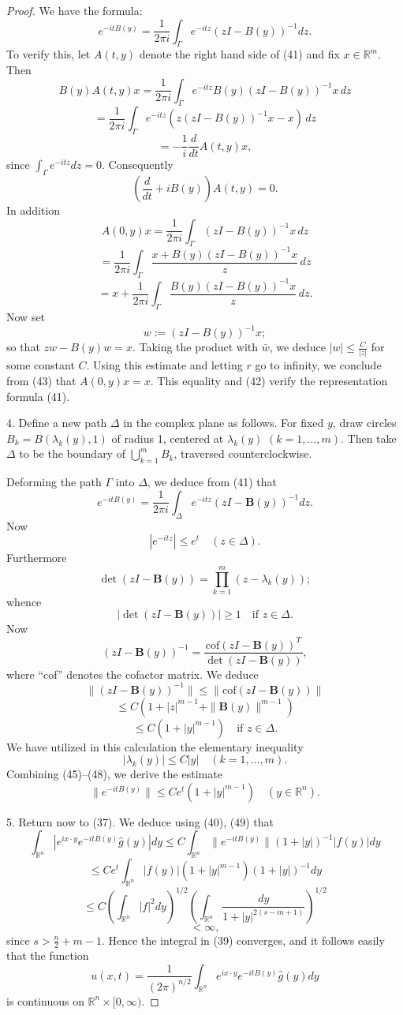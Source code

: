 \begin{proof}
We have the formula:
\[
e^{-itB(y)} = \frac{1}{2\pi i} \int_\Gamma e^{-itz}(zI - B(y))^{-1} dz.
\tag{41}
\]
To verify this, let $A(t, y)$ denote the right hand side of (41) and fix $x \in \mathbb{R}^m$. Then
\[
B(y)A(t,y)x = \frac{1}{2\pi i} \int_\Gamma e^{-itz}B(y)(zI - B(y))^{-1}x \, dz
\]
\[
= \frac{1}{2\pi i} \int_\Gamma e^{-itz}(z(zI - B(y))^{-1}x - x) \, dz
\]
\[
= -\frac{1}{i} \frac{d}{dt} A(t,y)x,
\]
since $\int_\Gamma e^{-itz} dz = 0$. Consequently
\[
\left(\frac{d}{dt} + iB(y)\right) A(t,y) = 0.
\tag{42}
\]
In addition
\[
A(0,y)x = \frac{1}{2\pi i} \int_\Gamma (zI - B(y))^{-1}x \, dz
\]
\[
= \frac{1}{2\pi i} \int_\Gamma \frac{x + B(y)(zI - B(y))^{-1}x}{z} \, dz
\]
\[
= x + \frac{1}{2\pi i} \int_\Gamma \frac{B(y)(zI - B(y))^{-1}x}{z} \, dz.
\tag{43}
\]
Now set
\[
w := (zI - B(y))^{-1}x;
\tag{44}
\]
so that $zw - B(y)w = x$. Taking the product with $\bar{w}$, we deduce $|w| \leq \frac{C}{|z|}$ for some constant $C$. Using this estimate and letting $r$ go to infinity, we conclude from (43) that $A(0,y)x = x$. This equality and (42) verify the representation formula (41).

4. Define a new path $\Delta$ in the complex plane as follows. For fixed $y$, draw circles $B_k = B(\lambda_k(y), 1)$ of radius 1, centered at $\lambda_k(y)$ $(k = 1, \ldots, m)$. Then take $\Delta$ to be the boundary of $\bigcup_{k=1}^m B_k$, traversed counterclockwise.

Deforming the path $\Gamma$ into $\Delta$, we deduce from (41) that
\[
e^{-itB(y)} = \frac{1}{2\pi i}\int_\Delta e^{-itz}(zI - \mathbf{B}(y))^{-1}dz.
\tag{45}
\]
Now
\[
|e^{-itz}| \le e^t \quad (z \in \Delta).
\tag{46}
\]
Furthermore
\[
\det(zI - \mathbf{B}(y)) = \prod_{k=1}^m (z - \lambda_k(y));
\]
whence
\[
|\det(zI - \mathbf{B}(y))| \ge 1 \quad \text{if } z \in \Delta.
\tag{47}
\]
Now
\[
(zI - \mathbf{B}(y))^{-1} = \frac{\text{cof}(zI - \mathbf{B}(y))^T}{\det(zI - \mathbf{B}(y))},
\]
where ``cof'' denotes the cofactor matrix. We deduce
\[
\|(zI - \mathbf{B}(y))^{-1}\| \le \|\text{cof}(zI - \mathbf{B}(y))\|
\]
\[
\le C(1 + |z|^{m-1} + \|\mathbf{B}(y)\|^{m-1})
\]
\[
\le C(1 + |y|^{m-1}) \quad \text{if } z \in \Delta.
\tag{48}
\]
We have utilized in this calculation the elementary inequality
\[
|\lambda_k(y)| \le C|y| \quad (k = 1, \ldots, m).
\]
Combining (45)--(48), we derive the estimate
\[
\|e^{-itB(y)}\| \le Ce^t(1 + |y|^{m-1}) \quad (y \in \mathbb{R}^n).
\tag{49}
\]

5. Return now to (37). We deduce using (40), (49) that
\[
\int_{\mathbb{R}^n} |e^{ix \cdot y}e^{-itB(y)}\hat{g}(y)| dy \le C\int_{\mathbb{R}^n} \|e^{-itB(y)}\|(1 + |y|)^{-1}|f(y)| dy
\]
\[
\le Ce^t\int_{\mathbb{R}^n} |f(y)|(1 + |y|^{m-1})(1 + |y|)^{-1} dy
\]
\[
\le C\left(\int_{\mathbb{R}^n} |f|^2 dy\right)^{1/2}\left(\int_{\mathbb{R}^n} \frac{dy}{1 + |y|^{2(s-m+1)}}\right)^{1/2}
\]
\[
< \infty,
\]
since $s > \frac{n}{2} + m - 1$. Hence the integral in (39) converges, and it follows easily that the function
\[
u(x,t) = \frac{1}{(2\pi)^{n/2}} \int_{\mathbb{R}^n} e^{ix \cdot y} e^{-itB(y)} \hat{g}(y) dy
\]
is continuous on $\mathbb{R}^n \times [0, \infty)$.


\end{proof}
